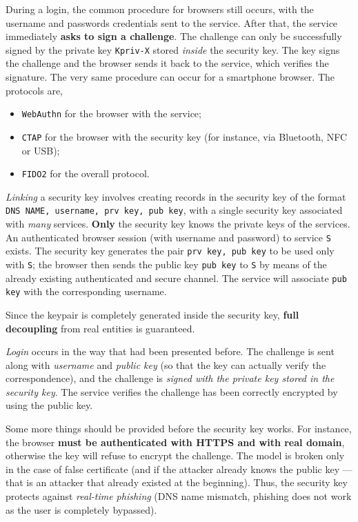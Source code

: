 \documentclass[10pt]{\classname}
\begin{document}
During a login, the common procedure for browsers still occurs, with the
username and passwords credentials sent to the service. After that, the service
immediately \textbf{asks to sign a challenge}. The challenge can only be
successfully signed by the private key \texttt{Kpriv-X} stored \emph{inside}
the security key. The key signs the challenge and the browser sends it back to
the service, which verifies the signature. The very same procedure can occur
for a smartphone browser. The protocols are, 
\begin{itemize}
    \item \texttt{WebAuthn} for the browser with the service;
    \item \texttt{CTAP} for the browser with the security key (for instance,
        via Bluetooth, NFC or USB);
    \item \texttt{FIDO2} for the overall protocol.
\end{itemize}

\emph{Linking} a security key involves creating records in the security key of
the format \texttt{DNS NAME, username, prv key, pub key}, with a single
security key associated with \emph{many} services. \textbf{Only} the security
key knows the private keys of the services. An authenticated browser session
(with username and password) to service \texttt{S} exists. The security key
generates the pair \texttt{prv key, pub key} to be used only with \texttt{S};
the browser then sends the public key \texttt{pub key} to \texttt{S} by means
of the already existing authenticated and secure channel. The service will
associate \texttt{pub key} with the corresponding username.

Since the keypair is completely generated inside the security key, \textbf{full
decoupling} from real entities is guaranteed.

\emph{Login} occurs in the way that had been presented before. The challenge is
sent along with \emph{username} and \emph{public key} (so that the key can
actually verify the correspondence), and the challenge is \emph{signed with the
private key stored in the security key}. The service verifies the challenge has
been correctly encrypted by using the public key.

Some more things should be provided before the security key works. For
instance, the browser \textbf{must be authenticated with HTTPS and with real
domain}, otherwise the key will refuse to encrypt the challenge. The model is
broken only in the case of false certificate (and if the attacker already knows
the public key --- that is an attacker that already existed at the beginning).
Thus, the security key protects against \emph{real\--time phishing} (DNS name
mismatch, phishing does not work as the user is completely bypassed).
\end{document}
